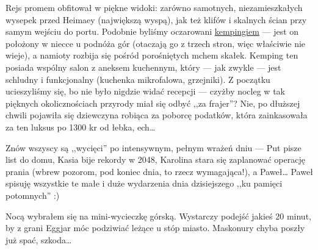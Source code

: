 
Rejs promem obfitował w piękne widoki: zarówno samotnych, niezamieszkałych wysepek przed Heimaey (największą wyspą), jak też klifów i skalnych ścian przy samym wejściu do portu. Podobnie byliśmy oczarowani \href{http://www.tjalda.is/en/herjolfsdalur/}{kempingiem} --- jest on położony w niecce u podnóża gór (otaczają go z trzech stron, więc właściwie nie wieje), a namioty rozbija się pośród porośniętych mchem skałek. Kemping ten posiada wspólny salon z aneksem kuchennym, który --- jak zwykle --- jest schludny i funkcjonalny (kuchenka mikrofalowa, grzejniki). Z początku ucieszyliśmy się, bo nie było nigdzie widać recepcji --- czyżby nocleg w tak pięknych okolicznościach przyrody miał się odbyć ,,za frajer''? Nie, po dłuższej chwili pojawiła się dziewczyna robiąca za poborcę podatków, która zainkasowała za ten luksus po 1300 kr od łebka, ech…


Znów wszyscy są ,,wycięci'' po intensywnym, pełnym wrażeń dniu --- Put pisze list do domu, Kasia bije rekordy w 2048, Karolina stara się zaplanować operację prania (wbrew pozorom, pod koniec dnia, to rzecz wymagająca!), a Paweł… Paweł spisuję wszystkie te małe i duże wydarzenia dnia dzisiejszego ,,ku pamięci potomnych'' :)

Nocą wybrałem się na mini-wycieczkę górską. Wystarczy podejść jakieś 20 minut, by z grani Eggjar móc podziwiać leżące u stóp miasto. Maskonury chyba poszły już spać, szkoda…